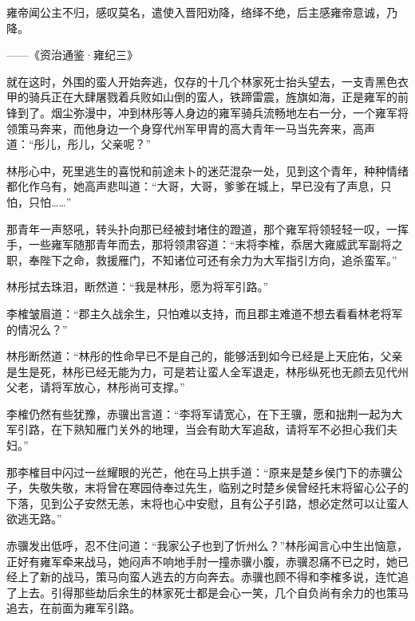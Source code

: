 雍帝闻公主不归，感叹莫名，遣使入晋阳劝降，络绎不绝，后主感雍帝意诚，乃降。

——《资治通鉴·雍纪三》

就在这时，外围的蛮人开始奔逃，仅存的十几个林家死士抬头望去，一支青黑色衣甲的骑兵正在大肆屠戮着兵败如山倒的蛮人，铁蹄雷震，旌旗如海，正是雍军的前锋到了。烟尘弥漫中，冲到林彤等人身边的雍军骑兵流畅地左右一分，一个雍军将领策马奔来，而他身边一个身穿代州军甲胄的高大青年一马当先奔来，高声道：“彤儿，彤儿，父亲呢？”

林彤心中，死里逃生的喜悦和前途未卜的迷茫混杂一处，见到这个青年，种种情绪都化作乌有，她高声悲叫道：“大哥，大哥，爹爹在城上，早已没有了声息，只怕，只怕……”

那青年一声怒吼，转头扑向那已经被封堵住的蹬道，那个雍军将领轻轻一叹，一挥手，一些雍军随那青年而去，那将领肃容道：“末将李榷，忝居大雍威武军副将之职，奉陛下之命，救援雁门，不知诸位可还有余力为大军指引方向，追杀蛮军。”

林彤拭去珠泪，断然道：“我是林彤，愿为将军引路。”

李榷皱眉道：“郡主久战余生，只怕难以支持，而且郡主难道不想去看看林老将军的情况么？”

林彤断然道：“林彤的性命早已不是自己的，能够活到如今已经是上天庇佑，父亲是生是死，林彤已经无能为力，可是若让蛮人全军退走，林彤纵死也无颜去见代州父老，请将军放心，林彤尚可支撑。”

李榷仍然有些犹豫，赤骥出言道：“李将军请宽心，在下王骥，愿和拙荆一起为大军引路，在下熟知雁门关外的地理，当会有助大军追敌，请将军不必担心我们夫妇。”

那李榷目中闪过一丝耀眼的光芒，他在马上拱手道：“原来是楚乡侯门下的赤骥公子，失敬失敬，末将曾在寒园侍奉过先生，临别之时楚乡侯曾经托末将留心公子的下落，见到公子安然无恙，末将也心中安慰，且有公子引路，想必定然可以让蛮人欲逃无路。”

赤骥发出低呼，忍不住问道：“我家公子也到了忻州么？”林彤闻言心中生出恼意，正好有雍军牵来战马，她闷声不响地手肘一撞赤骥小腹，赤骥忍痛不已之时，她已经上了新的战马，策马向蛮人逃去的方向奔去。赤骥也顾不得和李榷多说，连忙追了上去。引得那些劫后余生的林家死士都是会心一笑，几个自负尚有余力的也策马追去，在前面为雍军引路。


